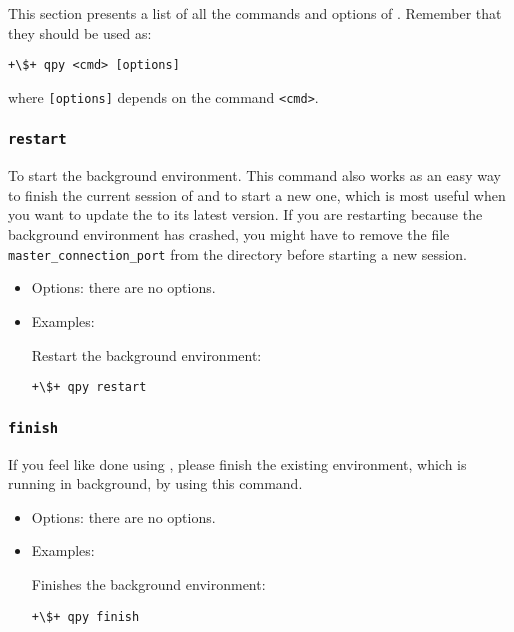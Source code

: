 \documentclass[a4paper,12pt]{article}
\begin{document}
This section presents a list of all the commands and options of \qpy{}.
Remember that they should be used as:
\begin{lstlisting}[style=BashStyle]
+\$+ qpy <cmd> [options]
\end{lstlisting}
where \texttt{[options]} depends on the command \texttt{<cmd>}.

\subsubsection{\texttt{restart}}

To start the \qpy{} background environment.
This command also works as an easy way to finish the current session of \qpy{} and to start a new one, which is most useful when you want to update the \qpy{} to its latest version.
If you are restarting \qpy{} because the background environment has crashed, you might have to remove the file \texttt{master\_connection\_port} from the \qpy{} directory before starting a new \qpy{} session. 

\begin{itemize}
\item Options:
  there are no options.

\item Examples:

  Restart the \qpy{} background environment:

\begin{lstlisting}[style=BashStyle]
+\$+ qpy restart
\end{lstlisting}
\end{itemize}  

\subsubsection{\texttt{finish}}

If you feel like done using \qpy{}, please finish the existing \qpy{} environment, which is running in background, by using this command.

\begin{itemize}
\item Options:
  there are no options.
  
\item Examples:
  
  Finishes the background \qpy{} environment:

\begin{lstlisting}[style=BashStyle]
+\$+ qpy finish
\end{lstlisting}
  \end{itemize}
\end{document}
